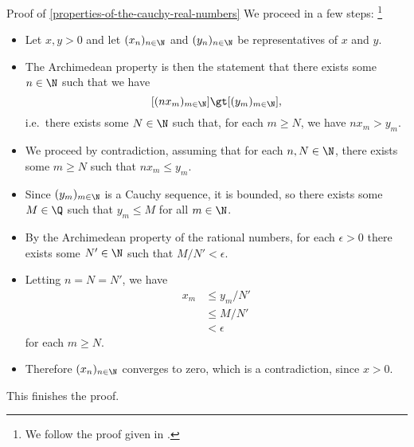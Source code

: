 \begin{Proof}{Proof of \cref{properties-of-the-cauchy-real-numbers}}
    We proceed in a few steps:%
    \footnote{%
        We follow the proof given in \cite[Theorem 4.11]{kemp:cauchy-s-construction-of-r}.
    }%
    \begin{itemize}
        \item Let $x,y\gt0$ and let $(x_{n})_{n\in\N}$ and $(y_{n})_{n\in\N}$ be representatives of $x$ and $y$.
        \item The Archimedean property is then the statement that there exists some $n\in\N$ such that we have
            \[
                [(nx_{m})_{m\in\N}]%
                \gt%
                [(y_{m})_{m\in\N}],%
            \]%
            i.e.\ there exists some $N\in\N$ such that, for each $m\geq N$, we have $nx_{m}\gt y_{m}$.
        \item We proceed by contradiction, assuming that for each $n,N\in\N$, there exists some $m\geq N$ such that $nx_{m}\leq y_{m}$.
        \item Since $(y_{m})_{m\in\N}$ is a Cauchy sequence, it is bounded, so there exists some $M\in\Q$ such that $y_{m}\leq M$ for all $m\in\N$.
        \item By the Archimedean property of the rational numbers, for each $\epsilon\gt0$ there exists some $N'\in\N$ such that $M/N'\lt\epsilon$.
        \item Letting $n=N=N'$, we have
            \begin{align*}
                x_{m} &\leq  y_{m}/N'\\
                      &\leq  M/N'\\
                      &\lt \epsilon
            \end{align*}
            for each $m\geq N$.
        \item Therefore $(x_{n})_{n\in\N}$ converges to zero, which is a contradiction, since $x\gt0$.
    \end{itemize}
    This finishes the proof.


\end{Proof}

